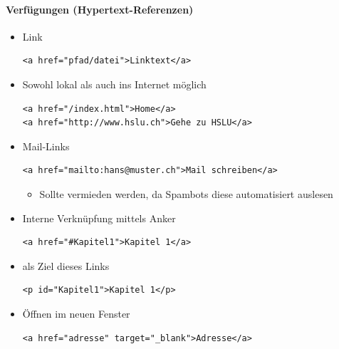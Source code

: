 \paragraph{Verfügungen (Hypertext-Referenzen)}
\begin{itemize}[noitemsep,topsep=0pt,leftmargin=*]
    \item Link
    \begin{lstlisting}
<a href="pfad/datei">Linktext</a>
    \end{lstlisting}
    \item Sowohl lokal als auch ins Internet möglich
    \begin{lstlisting}
<a href="/index.html">Home</a>
<a href="http://www.hslu.ch">Gehe zu HSLU</a>
    \end{lstlisting}

    \item Mail-Links
    \begin{lstlisting}
<a href="mailto:hans@muster.ch">Mail schreiben</a>
    \end{lstlisting}
    \begin{itemize}[noitemsep,topsep=0pt,leftmargin=*]
        \item Sollte vermieden werden, da Spambots diese automatisiert auslesen
    \end{itemize}
        \item Interne Verknüpfung mittels Anker
    \begin{lstlisting}
<a href="#Kapitel1">Kapitel 1</a>
    \end{lstlisting}
    \item als Ziel dieses Links
    \begin{lstlisting}
<p id="Kapitel1">Kapitel 1</p>
    \end{lstlisting}
    \item Öffnen im neuen Fenster
    \begin{lstlisting}
<a href="adresse" target="_blank">Adresse</a>
    \end{lstlisting}
\end{itemize}

